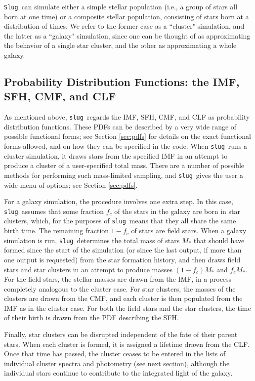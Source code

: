 \documentclass[12pt]{article}
\newcommand{\slug}{\texttt{slug}}
\newcommand{\Slug}{\texttt{Slug}}
\begin{document}
\Slug\ can simulate either a simple stellar population (i.e., a group of stars all born at one time) or a composite stellar population, consisting of stars born at a distribution of times. We refer to the former case as a ``cluster" simulation, and the latter as a ``galaxy" simulation, since one can be thought of as approximating the behavior of a single star cluster, and the other as approximating a whole galaxy.

\subsection{Probability Distribution Functions: the IMF, SFH, CMF, and CLF}
\label{ssec:slugpdfs}

As mentioned above, \slug\ regards the IMF, SFH, CMF, and CLF as probability distribution functions. These PDFs can be described by a very wide range of possible functional forms; see Section \ref{sec:pdfs} for details on the exact functional forms allowed, and on how they can be specified in the code. When \slug\ runs a cluster simulation, it draws stars from the specified IMF in an attempt to produce a cluster of a user-specified total mass. There are a number of possible methods for performing such mass-limited sampling, and \slug\ gives the user a wide menu of options; see Section \ref{sec:pdfs}. 

For a galaxy simulation, the procedure involves one extra step. In this case, \slug\ assumes that some fraction $f_c$ of the stars in the galaxy are born in star clusters, which, for the purposes of \slug\, means that they all share the same birth time. The remaining fraction $1-f_c$ of stars are field stars. When a galaxy simulation is run, \slug\ determines the total mass of stars $M_*$ that should have formed since the start of the simulation (or since the last output, if more than one output is requested) from the star formation history, and then draws field stars and star clusters in an attempt to produce masses $(1-f_c)M_*$ and $f_c M_*$. For the field stars, the stellar masses are drawn from the IMF, in a process completely analogous to the cluster case. For star clusters, the masses of the clusters are drawn from the CMF, and each cluster is then populated from the IMF as in the cluster case. For both the field stars and the star clusters, the time of their birth is drawn from the PDF describing the SFH.

Finally, star clusters can be disrupted independent of the fate of their parent stars. When each cluster is formed, it is assigned a lifetime drawn from the CLF. Once that time has passed, the cluster ceases to be entered in the lists of individual cluster spectra and photometry (see next section), although the individual stars continue to contribute to the integrated light of the galaxy.
\end{document}

